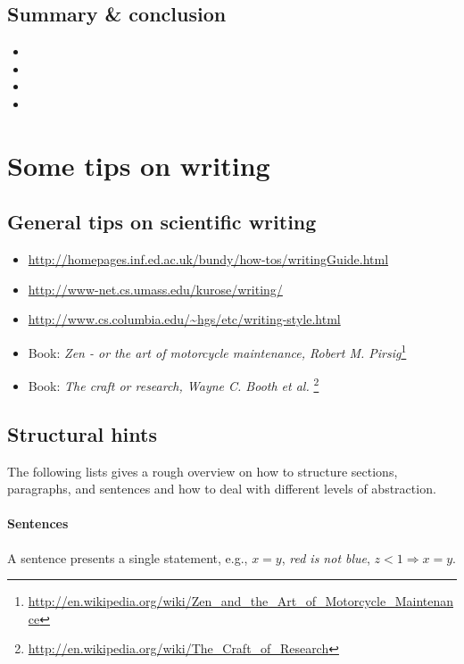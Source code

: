 \documentclass{article}
\begin{document}
\subsection{Summary \& conclusion}
\begin{itemize}
	\item 
	\item 
	\item 
	\item 
\end{itemize}







\section{Some tips on writing}


\subsection{General tips on scientific writing}

\begin{itemize}
	\item \url{http://homepages.inf.ed.ac.uk/bundy/how-tos/writingGuide.html}
	\item \url{http://www-net.cs.umass.edu/kurose/writing/}
	\item \url{http://www.cs.columbia.edu/~hgs/etc/writing-style.html}
	\item Book: \emph{Zen - or the art of motorcycle maintenance, Robert M. Pirsig}\footnote{\url{http://en.wikipedia.org/wiki/Zen_and_the_Art_of_Motorcycle_Maintenance}}
	\item Book: \emph{The craft or research, Wayne C. Booth et al.} \footnote{\url{http://en.wikipedia.org/wiki/The_Craft_of_Research}}
\end{itemize}


\subsection{Structural hints}

The following lists gives a rough overview on how to structure sections, paragraphs, and sentences and how to deal with different levels of abstraction.

\paragraph{Sentences}
A sentence presents a single statement, e.g., $x = y$, \emph{red is not blue}, $z < 1 \Rightarrow x = y$.
\end{document}
